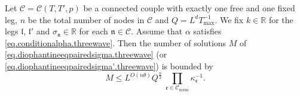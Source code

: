 \begin{prop}\label{prop.counting}
Let $\mathcal{C}=\mathcal{C}(T,T',p)$ be a connected couple with exactly one free and one fixed leg, $n$ be the total number of nodes in $\mathcal{C}$ and $Q=L^{d}T^{-1}_{\text{max}}$. We fix $k\in \mathbb{R}$ for the legs $\mathfrak{l}$, $\mathfrak{l}'$ and $\sigma_{\mathfrak{n}}\in\mathbb{R}$ for each $\mathfrak{n}\in \mathcal{C}$. Assume that $\alpha$ satisfies \eqref{eq.conditionalpha.threewave}. Then the number of solutions $M$ of \eqref{eq.diophantineeqpairedsigma.threewave} (or \eqref{eq.diophantineeqpairedsigma'.threewave}) is bounded by 
\begin{equation}\label{eq.countingbd0.threewave}
M\leq L^{O(n\theta)} Q^{\frac{n}{2}}\ \prod_{\mathfrak{e}\in \mathcal{C}_{\text{norm}}} \kappa^{-1}_{\mathfrak{e}}.
\end{equation}
\end{prop}
